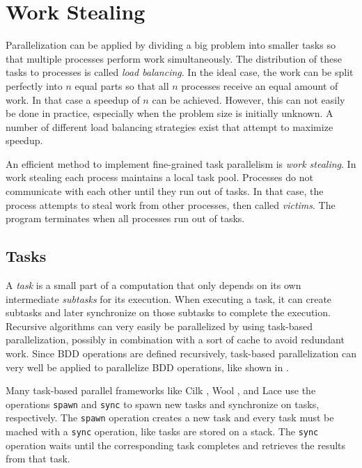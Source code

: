 \section{Work Stealing}
Parallelization can be applied by dividing a big problem into smaller tasks so that multiple processes perform work simultaneously. The distribution of these tasks to processes is called \emph{load balancing}. In the ideal case, the work can be split perfectly into $n$ equal parts so that all $n$ processes receive an equal amount of work. In that case a speedup of $n$ can be achieved. However, this can not easily be done in practice, especially when the problem size is initially unknown. A number of different load balancing strategies exist that attempt to maximize speedup.

An efficient method to implement fine-grained task parallelism is \emph{work stealing}. In work stealing each process maintains a local task pool. Processes do not communicate with each other until they run out of tasks. In that case, the process attempts to steal work from other processes, then called \emph{victims}. The program terminates when all processes run out of tasks.

\subsection{Tasks}
A \emph{task} is a small part of a computation that only depends on its own intermediate \emph{subtasks} for its execution. When executing a task, it can create subtasks and later synchronize on those subtasks to complete the execution. Recursive algorithms can very easily be parallelized by using task-based parallelization, possibly in combination with a sort of cache to avoid redundant work. Since BDD operations are defined recursively, task-based parallelization can very well be applied to parallelize BDD operations, like shown in \cite{sylvan_multicore_bdd}.

Many task-based parallel frameworks like Cilk \cite{blumofe1996cilk}, Wool \cite{faxen2009wool}, and Lace \cite{lace} use the operations \texttt{spawn} and \texttt{sync} to spawn new tasks and synchronize on tasks, respectively. The \texttt{spawn} operation creates a new task and every task must be mached with a \texttt{sync} operation, like tasks are stored on a stack. The \texttt{sync} operation waits until the corresponding task completes and retrieves the results from that task. 

